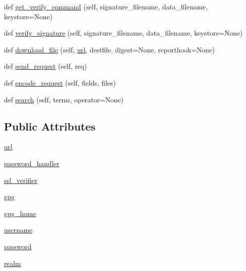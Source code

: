 \begin{DoxyCompactItemize}
def \hyperlink{classpip_1_1__vendor_1_1distlib_1_1index_1_1PackageIndex_a6b7600d86dad5f090c2193ec5a6e4044}{get\+\_\+verify\+\_\+command} (self, signature\+\_\+filename, data\+\_\+filename, keystore=None)
\item 
def \hyperlink{classpip_1_1__vendor_1_1distlib_1_1index_1_1PackageIndex_a54c6290115dc97752df48e2d6a7d512c}{verify\+\_\+signature} (self, signature\+\_\+filename, data\+\_\+filename, keystore=None)
\item 
def \hyperlink{classpip_1_1__vendor_1_1distlib_1_1index_1_1PackageIndex_a5f995fbbf062791bd9ed4fbf48aa2854}{download\+\_\+file} (self, \hyperlink{classpip_1_1__vendor_1_1distlib_1_1index_1_1PackageIndex_a89367ad4a25e519fa60da0c73379a523}{url}, destfile, digest=None, reporthook=None)
\item 
def \hyperlink{classpip_1_1__vendor_1_1distlib_1_1index_1_1PackageIndex_a57f63332fa0eab5204874d167d751e70}{send\+\_\+request} (self, req)
\item 
def \hyperlink{classpip_1_1__vendor_1_1distlib_1_1index_1_1PackageIndex_afa787474bf34ee59d4a4e599b0099f11}{encode\+\_\+request} (self, fields, files)
\item 
def \hyperlink{classpip_1_1__vendor_1_1distlib_1_1index_1_1PackageIndex_a997a8e0cea9a01f10a0e1466ed503bee}{search} (self, terms, operator=None)
\end{DoxyCompactItemize}
\subsection*{Public Attributes}
\begin{DoxyCompactItemize}
\item 
\hyperlink{classpip_1_1__vendor_1_1distlib_1_1index_1_1PackageIndex_a89367ad4a25e519fa60da0c73379a523}{url}
\item 
\hyperlink{classpip_1_1__vendor_1_1distlib_1_1index_1_1PackageIndex_ac343ab6e088ff958339a302a4d4d79aa}{password\+\_\+handler}
\item 
\hyperlink{classpip_1_1__vendor_1_1distlib_1_1index_1_1PackageIndex_a58c1d59260485a55fd5bb3722a5d94fa}{ssl\+\_\+verifier}
\item 
\hyperlink{classpip_1_1__vendor_1_1distlib_1_1index_1_1PackageIndex_aafcfb8497f5a6f0b3c7b88f9d4e1a46a}{gpg}
\item 
\hyperlink{classpip_1_1__vendor_1_1distlib_1_1index_1_1PackageIndex_a13ce9bc0b347884b3a80eac12e45dcbe}{gpg\+\_\+home}
\item 
\hyperlink{classpip_1_1__vendor_1_1distlib_1_1index_1_1PackageIndex_af5f91eb7d117f355b07c72d0c2d202b5}{username}
\item 
\hyperlink{classpip_1_1__vendor_1_1distlib_1_1index_1_1PackageIndex_a475ad51435107405a1c12e3c58dd4c2d}{password}
\item 
\hyperlink{classpip_1_1__vendor_1_1distlib_1_1index_1_1PackageIndex_ad2efd19dc343bcdc6b7832c157957431}{realm}
\end{DoxyCompactItemize}

